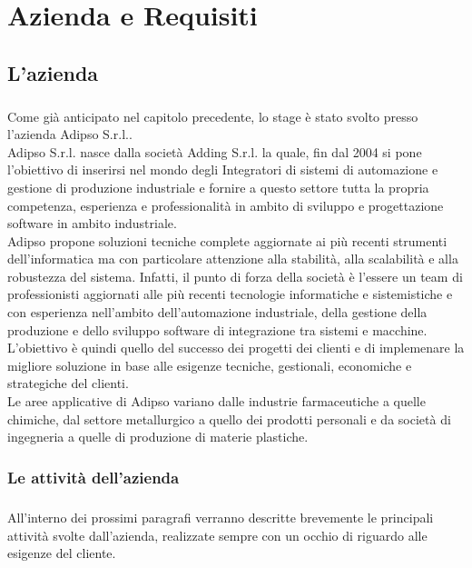 \chapter{Azienda e Requisiti}
  \label{chapter_azienda_requisiti}
  \section{L'azienda}
  \paragraph{}
  Come già anticipato nel capitolo precedente, lo stage è stato svolto presso l'azienda Adipso S.r.l..\\
  Adipso S.r.l. nasce dalla società Adding S.r.l. la quale, fin dal 2004 si pone l'obiettivo di inserirsi nel
  mondo degli Integratori di sistemi di automazione e gestione di produzione industriale e fornire
  a questo settore tutta la propria competenza, esperienza e professionalità in ambito di sviluppo e progettazione
  software in ambito industriale.\\
  Adipso propone soluzioni tecniche complete aggiornate ai più recenti strumenti dell'informatica
  ma con particolare attenzione alla stabilità, alla scalabilità e alla robustezza del sistema. Infatti, 
  il punto di forza della società è l'essere un team di professionisti aggiornati alle più recenti tecnologie 
  informatiche e sistemistiche e con esperienza nell'ambito dell'automazione industriale, della gestione 
  della produzione e dello sviluppo software di integrazione tra sistemi e macchine.\\
  L'obiettivo è quindi quello del successo dei progetti dei clienti e di implemenare la migliore soluzione 
  in base alle esigenze tecniche, gestionali, economiche e strategiche del clienti.\\
  Le aree applicative di Adipso variano dalle industrie farmaceutiche a quelle chimiche, dal settore metallurgico 
  a quello dei prodotti personali e da società di ingegneria a quelle di produzione di materie plastiche.
  \subsection{Le attività dell'azienda}
  \paragraph{}
  All'interno dei prossimi paragrafi verranno descritte brevemente le principali attività svolte
  dall'azienda, realizzate sempre con un occhio di riguardo alle esigenze del cliente.
